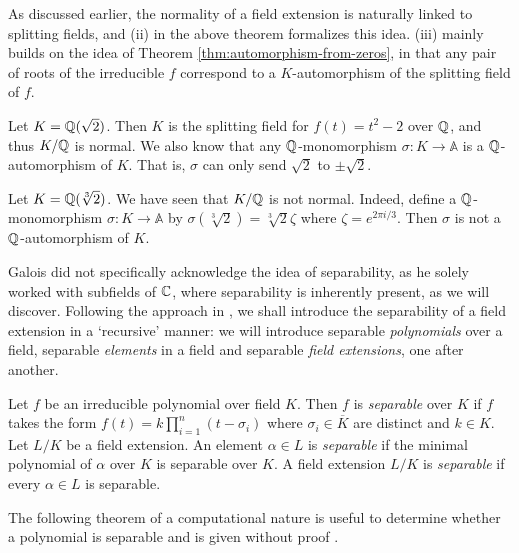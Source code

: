 As discussed earlier, the normality of a field extension is naturally linked to splitting fields, and (ii) in the above theorem formalizes this idea. (iii) mainly builds on the idea of Theorem \ref{thm:automorphism-from-zeros}, in that any pair of roots of the irreducible $f$ correspond to a $K$-automorphism of the splitting field of $f$. 

\begin{example}
	Let $K = \mathbb Q (\sqrt 2)$. Then $K$ is the splitting field for $f(t) = t^2 - 2$ over $\mathbb Q$, and thus $K/ \mathbb Q$ is normal. We also know that any $\mathbb Q$-monomorphism $\sigma: K \to \mathbb A$ is a $\mathbb Q$-automorphism of $K$. That is, $\sigma$ can only send $\sqrt 2$ to $\pm \sqrt 2$. 
\end{example}

\begin{example}
	Let $K = \mathbb Q(\sqrt[3]{2})$. We have seen that $K / \mathbb Q$ is not normal. Indeed, define a $\mathbb Q$-monomorphism $\sigma : K \to \mathbb A$ by $\sigma(\sqrt[3]{2}) =  \sqrt[3]{2}\zeta $ where $\zeta = e^{2 \pi i / 3}$. Then $\sigma$ is not a $\mathbb Q$-automorphism of $K$. 
\end{example}



Galois did not specifically acknowledge the idea of separability, as he solely worked with subfields of $\mathbb C$, where separability is inherently present, as we will discover. Following the approach in \cite[p.~128-129]{Stewart}, we shall introduce the separability of a field extension in a `recursive' manner: we will introduce separable \textit{polynomials} over a field, separable \textit{elements} in a field and separable \textit{field extensions}, one after another. 

\begin{definition}
    Let $f$ be an irreducible polynomial over field $K$. Then $f$ is \textit{separable} over $K$ if $f$ takes the form 
    $
        f(t) = k \prod_{i = 1} ^ n(t - \sigma_i)
    $
    where $\sigma_i \in \overline K$ are distinct and $k \in K$.
    Let $L/K$ be a field extension. An element $\alpha \in L$ is \textit{separable} if the minimal polynomial of $\alpha$ over $K$ is separable over $K$.
    A field extension $L / K$ is \textit{separable} if every $\alpha \in L$ is separable.
\end{definition}

The following theorem of a computational nature is useful to determine whether a polynomial is separable and is given without proof \cite[p.~128]{Stewart}. 

